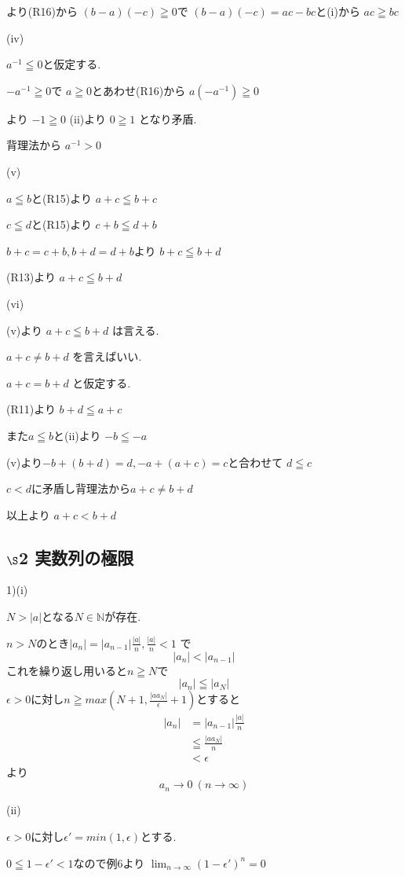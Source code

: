 \documentclass{jsarticle}
\begin{document}
より(R16)から
$(b-a)(-c)\geqq 0$で
$(b-a)(-c)=ac-bc$と(i)から
$ac\geqq bc$


(iv)

$a^{-1}\leqq 0$と仮定する.

$-a^{-1}\geqq 0$で
$a\geqq 0$とあわせ(R16)から
$a(-a^{-1})\geqq 0$

より
$-1\geqq 0$
(ii)より
$0\geqq 1$
となり矛盾.

背理法から
$a^{-1}>0$


(v)

$a\leqq b$と(R15)より
$a+c \leqq b+c$

$c\leqq d$と(R15)より
$c+b \leqq d+b$

$b+c=c+b,b+d=d+b$より
$b+c \leqq b+d$

(R13)より
$a+c\leqq b+d$


(vi)


(v)より
$a+c\leqq b+d$
は言える.

$a+c\neq b+d$
を言えばいい.

$a+c = b+d$
と仮定する.

(R11)より
$b+d\leqq a+c$

また$a\leqq b$と(ii)より
$-b\leqq -a$

(v)より$-b+(b+d)=d,-a+(a+c)=c$と合わせて
$d\leqq c$

$c<d$に矛盾し背理法から$a+c\neq b+d$


以上より
$a+c < b+d$


\subsection*{$\S$2 実数列の極限}
1)(i)

$N>|a|$となる$N\in\mathbb{N}$が存在.

$n>N$のとき$|a_n| = |a_{n-1}|\frac{|a|}{n},\frac{|a|}{n}<1$ で
\[|a_n| < |a_{n-1}|\]
これを繰り返し用いると$n\geqq N$で
\[|a_n| \leqq |a_N|\]
$\epsilon > 0$に対し$n \geqq max(N+1,\frac{|aa_N|}{\epsilon}+1)$とすると
\begin{align*}
|a_n| &= |a_{n-1}|\frac{|a|}{n}\\
&\leqq \frac{|aa_N|}{n} \\
&< \epsilon
\end{align*}
より
\[a_n\to0 \ (n\to \infty)\]


(ii)

$\epsilon > 0$に対し$\epsilon'=min(1,\epsilon)$とする.

$0\leqq 1-\epsilon' < 1$なので例6より
$\displaystyle \lim_{n\to \infty}(1-\epsilon')^n = 0$
\end{document}

